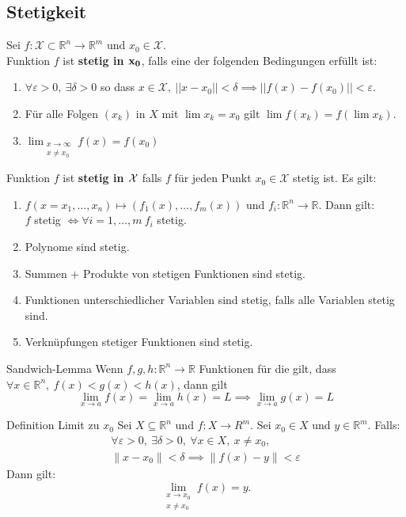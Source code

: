 \documentclass[a4paper,10pt]{article}
\def\R{\mathbb{R}}
\def\X{\mathcal{X}}
\begin{document}
\subsection{Stetigkeit}
Sei $f: \X \subset \R^n \to \R^m$  und $x_0 \in \X$. \\
Funktion $f$ ist \textbf{stetig in $\bf x_0$}, falls eine der folgenden Bedingungen erfüllt ist:
\begin{enumerate}
	\item $\forall \varepsilon > 0,\ \exists \delta > 0$ so dass $x \in \X,\ ||x - x_0|| < \delta \implies ||f(x) - f(x_0)|| < \varepsilon$.
	\item Für alle Folgen $(x_k)$ in $X$ mit $\lim x_k = x_0$ gilt $\lim f(x_k) = f(\lim x_k)$.
	\item $\displaystyle\lim_{\substack{x \to \infty \\ x \neq x_{0}}}f(x)=f(x_{0}) $
\end{enumerate}
Funktion $f$ ist \textbf{stetig in $\bf \X$} falls $f$ für jeden Punkt $x_0 \in \X$ stetig ist. Es gilt:
\begin{enumerate}
	\item $f(x = x_1, \ldots, x_n) \mapsto (f_1(x),\ldots,f_m(x))$ und $f_i: \R^n \to \R$. Dann gilt: \\
	$f$ stetig $\iff \forall i = 1, \ldots, m \ f_i$ stetig.
	\item Polynome sind stetig.
	\item Summen + Produkte von stetigen Funktionen sind stetig.
	\item Funktionen unterschiedlicher Variablen sind stetig, falls alle Variablen stetig sind.
	\item Verknüpfungen stetiger Funktionen sind stetig.
\end{enumerate}


\begin{mainbox}{Sandwich-Lemma}
	Wenn $f, g, h: \R^n \to \R$ Funktionen für die gilt, dass $\forall x \in \R^n,\ f(x) < g(x) < h(x)$, dann gilt
	$$\lim_{x\to a} f(x) = \lim_{x \to a} h(x) = L \implies \lim_{x\to a} g(x) = L$$
\end{mainbox}

\begin{mainbox}{Definition Limit zu $x_0$}
Sei $X \subseteq \mathbb{R}^{n}$ und $f:X\to R^{m}$. Sei $x_{0}\in X$ und $y\in\mathbb{R}^{m}$. Falls:
\begin{gather*}
\forall \varepsilon>0,\ \exists \delta>0,\ \forall x \in X,\ x\neq x_{0},\ \\
\|x-x_{0}\|<\delta\implies\|f(x)-y\|<\varepsilon
\end{gather*}
Dann gilt:
$$\displaystyle \lim _{\substack{x \rightarrow x_0 \\ x \neq x_0}} f(x)=y .$$
\end{mainbox}
\end{document}
